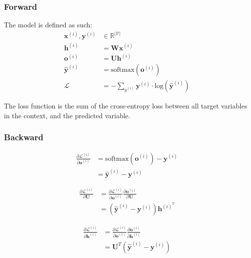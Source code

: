 \documentclass{article}
\begin{document}
\subsubsection{Forward}
The model is defined as such:
\begin{equation}
\begin{split}
	\bm{x}^{(i)}, \bm{y}^{(i)} &\in \mathbb{R}^{|\mathcal{V}|} \\
	\bm{h}^{(i)} &= \bm{W} \bm{x}^{(i)} \\
	\bm{o}^{(i)} &= \bm{U} \bm{h}^{(i)} \\
 	\hat{\bm{y}}^{(i)} &= \text{softmax}(\bm{o}^{(i)}) \\
	\mathcal{L} &= -\sum_{y^{(i)}} \bm{y}^{(i)} \cdot \text{log}(\hat{\bm{y}}^{(i)})
\end{split}
\end{equation}

The loss function is the sum of the cross-entropy loss between all target variables in the context, and the predicted variable.

\subsubsection{Backward}
\begin{equation}
\begin{split}
\frac{\partial \mathcal{L}^{(i)}}{\partial \bm{o}^{(i)}}
	&= \text{softmax}(\bm{o}^{(i)}) - \bm{y}^{(i)} \\
	&= \hat{\bm{y}}^{(i)} - \bm{y}^{(i)}
\end{split}
\end{equation}

\begin{equation}
\begin{split}
\frac{\partial \mathcal{L}^{(i)}}{\partial \bm{U}}
	&= \frac{\partial \mathcal{L}^{(i)}}{\partial \bm{o}^{(i)}} \frac{\partial \bm{o}^{(i)}}{\partial \bm{U}} \\
	&= (\hat{\bm{y}}^{(i)} - \bm{y}^{(i)}) \bm{h}^{(i)^T}
\end{split}
\end{equation}

\begin{equation}
\begin{split}
\frac{\partial \mathcal{L}^{(i)}}{\partial \bm{h}^{(i)}}
	&= \frac{\partial \mathcal{L}^{(i)}}{\partial \bm{o}^{(i)}} \frac{\partial \bm{o}^{(i)}}{\partial \bm{h}^{(i)}} \\
	&= \bm{U}^T(\hat{\bm{y}}^{(i)} - \bm{y}^{(i)})
\end{split}
\end{equation}
\end{document}
